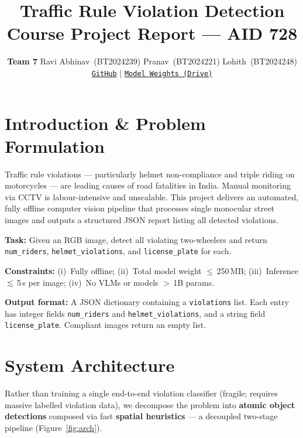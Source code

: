 \documentclass[10pt,a4paper,twocolumn]{article}
\title{
    \vspace{-2.0cm}
    \textbf{\Large Traffic Rule Violation Detection}\\[0.1cm]
    \normalsize Course Project Report — AID 728\vspace{-0.2cm}
}
\author{
    \textbf{Team 7} \quad
    Ravi Abhinav~(BT2024239) \quad
    Pranav~(BT2024221) \quad
    Lohith~(BT2024248) \\[0.05cm]
    \small
    \href{https://github.com/Lohith248/traffic-violations-detection}{\texttt{GitHub}}
    \enspace|\enspace
    \href{https://drive.google.com/drive/folders/13xa0CVVjczWiv5d7UlKGDpgwX7AxD3Ja?usp=sharing}{\texttt{Model Weights (Drive)}}
}
\date{}
\begin{document}
\maketitle
\thispagestyle{fancy}
\vspace{-5mm}

\section{Introduction \& Problem Formulation}
Traffic rule violations — particularly helmet non-compliance and triple riding on motorcycles — are leading causes of road fatalities in India. Manual monitoring via CCTV is labour-intensive and unscalable. This project delivers an automated, fully offline computer vision pipeline that processes single monocular street images and outputs a structured JSON report listing all detected violations.

\begin{infobox}
\textbf{Task:} Given an RGB image, detect all violating two-wheelers and return \texttt{num\_riders}, \texttt{helmet\_violations}, and \texttt{license\_plate} for each.
\end{infobox}

\noindent\textbf{Constraints:} (i)~Fully offline; (ii)~Total model weight $\leq$\,250\,MB; (iii)~Inference $\lesssim$\,5\,s per image; (iv)~No VLMs or models $>$\,1B params.

\noindent\textbf{Output format:} A JSON dictionary containing a \texttt{violations} list. Each entry has integer fields \texttt{num\_riders} and \texttt{helmet\_violations}, and a string field \texttt{license\_plate}. Compliant images return an empty list.

\section{System Architecture}
Rather than training a single end-to-end violation classifier (fragile; requires massive labelled violation data), we decompose the problem into \textbf{atomic object detections} composed via fast \textbf{spatial heuristics} — a decoupled two-stage pipeline (Figure~\ref{fig:arch}).
\end{document}

